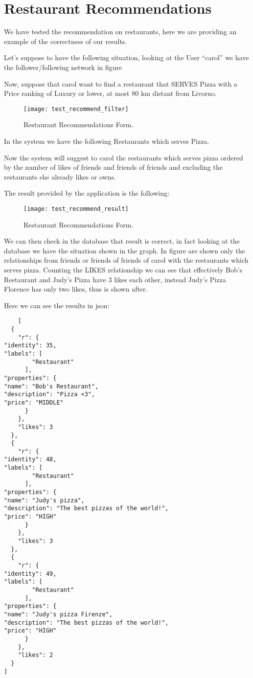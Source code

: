 \section{Restaurant Recommendations}

We have tested the recommendation on restaurants, here we are providing an
example of the correctness of our results.

Let's suppose to have the following situation, looking at the User ``carol'' we
have the follower/following network in figure


Now, suppose that carol want to find a restaurant that SERVES Pizza with a Price
ranking of Luxury or lower, at most 80 km distant from Livorno.

\begin{figure}[H]
	\centering
	\texttt{[image: test\_recommend\_filter]}
	\caption{Restaurant Recommendations Form.}\label{fig:resrecform}
\end{figure}

In the system we have the following Restaurants which serves Pizza.


Now the system will suggest to carol the restaurants which serves pizza ordered
by the number of likes of friends and friends of friends and excluding the
restaurants she already likes or owns.

The result provided by the application is the following:

\begin{figure}[H]
	\centering
	\texttt{[image: test\_recommend\_result]}
	\caption{Restaurant Recommendations Form.}\label{fig:resrecform}
\end{figure}

We can then check in the database that result is correct, in fact looking at the
database we have the situation shown in the graph. In figure are shown only the
relationships from friends or friends of friends of carol with the restaurants
which serves pizza.  Counting the LIKES relationship we can see that effectively
Bob's Restaurant and Judy's Pizza have 3 likes each other, instead Judy's Pizza
Florence has only two likes, thus is shown after.


Here we can see the results in json:

\begin{verbatim}
    [
  {
    "r": {
"identity": 35,
"labels": [
        "Restaurant"
      ],
"properties": {
"name": "Bob's Restaurant",
"description": "Pizza <3",
"price": "MIDDLE"
      }
    },
    "likes": 3
  },
  {
    "r": {
"identity": 48,
"labels": [
        "Restaurant"
      ],
"properties": {
"name": "Judy's pizza",
"description": "The best pizzas of the world!",
"price": "HIGH"
      }
    },
    "likes": 3
  },
  {
    "r": {
"identity": 49,
"labels": [
        "Restaurant"
      ],
"properties": {
"name": "Judy's pizza Firenze",
"description": "The best pizzas of the world!",
"price": "HIGH"
      }
    },
    "likes": 2
  }
]
\end{verbatim}
